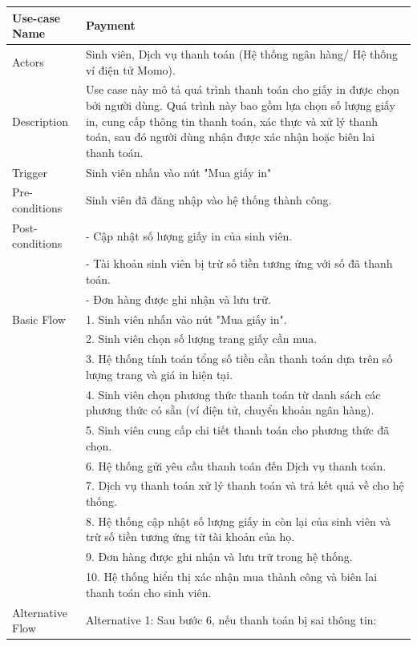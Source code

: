 \begin{enumerate}[a)]
    \begin{longtable}{|l|p{10cm}|}
        \hline
        \endhead
        \hline
        \endfoot
        Use-case Name & \textbf{Payment}\\
        \hline
        Actors & Sinh viên, Dịch vụ thanh toán (Hệ thống ngân hàng/ Hệ thống ví điện tử Momo).\\
        \hline
        Description & Use case này mô tả quá trình thanh toán cho giấy in được chọn bởi người dùng. Quá trình này bao gồm lựa chọn số lượng giấy in, cung cấp thông tin thanh toán, xác thực và xử lý thanh toán, sau đó người dùng nhận được xác nhận hoặc biên lai thanh toán.\\
        \hline
        Trigger & Sinh viên nhấn vào nút "Mua giấy in"\\
        \hline
        Pre-conditions & Sinh viên đã đăng nhập vào hệ thống thành công.\\
        \hline
        Post-conditions & - Cập nhật số lượng giấy in của sinh viên.\\
        & - Tài khoản sinh viên bị trừ số tiền tương ứng với số đã thanh toán.\\
        & - Đơn hàng được ghi nhận và lưu trữ.\\
        \hline
        Basic Flow & 1. Sinh viên nhấn vào nút "Mua giấy in".\\
        & 2. Sinh viên chọn số lượng trang giấy cần mua.\\
        & 3. Hệ thống tính toán tổng số tiền cần thanh toán dựa trên số lượng trang và giá in hiện tại.\\
        & 4. Sinh viên chọn phương thức thanh toán từ danh sách các phương thức có sẵn (ví điện tử, chuyển khoản ngân hàng).\\
        & 5. Sinh viên cung cấp chi tiết thanh toán cho phương thức đã chọn.\\
        & 6. Hệ thống gửi yêu cầu thanh toán đến Dịch vụ thanh toán.\\
        & 7. Dịch vụ thanh toán xử lý thanh toán và trả kết quả về cho hệ thống.\\
        & 8. Hệ thống cập nhật số lượng giấy in còn lại của sinh viên và trừ số tiền tương ứng từ tài khoản của họ.\\
        & 9. Đơn hàng được ghi nhận và lưu trữ trong hệ thống.\\
        & 10. Hệ thống hiển thị xác nhận mua thành công và biên lai thanh toán cho sinh viên.\\
        \hline
        Alternative Flow & Alternative 1: Sau bước 6, nếu thanh toán bị sai thông tin:\\

\end{longtable}
\end{enumerate}
